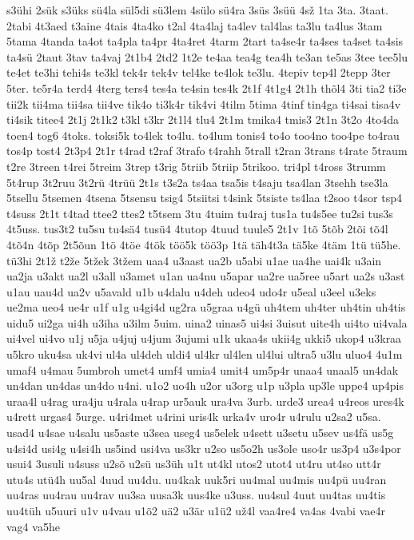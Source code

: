 {s3ühi
2sük
s3üks
sü4la
sül5di
sü3lem
4sülo
sü4ra
3süs
3süü
4sž
1ta
3ta.
3taat.
2tabi
4t3aed
t3aine
4tais
4ta4ko
t2al
4ta4laj
ta4lev
tal4las
ta3lu
ta4lus
3tam
5tama
4tanda
ta4ot
ta4pla
ta4pr
4ta4ret
4tarm
2tart
ta4se4r
ta4ses
ta4set
ta4sis
ta4sü
2taut
3tav
ta4vaj
2t1b4
2td2
1t2e
te4aa
tea4g
tea4h
te3an
te5as
3tee
tee5lu
te4et
te3hi
tehi4s
te3kl
tek4r
tek4v
tel4ke
te4lok
te3lu.
4tepiv
tep4l
2tepp
3ter
5ter.
te5r4a
terd4
4terg
ters4
tes4a
te4sin
tes4k
2t1f
4t1g4
2t1h
thõl4
3ti
tia2
ti3e
tii2k
tii4ma
tii4sa
tii4ve
tik4o
ti3k4r
tik4vi
4tilm
5tima
4tinf
tin4ga
ti4sai
tisa4v
ti4sik
titee4
2t1j
2t1k2
t3kl
t3kr
2t1l4
tlu4
2t1m
tmika4
tmis3
2t1n
3t2o
4to4da
toen4
tog6
4toks.
toksi5k
to4lek
to4lu.
to4lum
tonis4
to4o
too4no
too4pe
to4rau
tos4p
tost4
2t3p4
2t1r
t4rad
t2raf
3trafo
t4rahh
5trall
t2ran
3trans
t4rate
5traum
t2re
3treen
t4rei
5treim
3trep
t3rig
5triib
5triip
5trikoo.
tri4pl
t4ross
3trumm
5t4rup
3t2ruu
3t2rü
4trüü
2t1s
t3s2a
ts4aa
tsa5is
t4saju
tsa4lan
3tsehh
tse3la
5tsellu
5tsemen
4tsena
5tsensu
tsig4
5tsiitsi
t4sink
5tsiste
ts4laa
t2soo
t4sor
tsp4
t4suss
2t1t
t4tad
ttee2
ttes2
t5tsem
3tu
4tuim
tu4raj
tus1a
tu4s5ee
tu2si
tus3s
4t5uss.
tus3t2
tu5su
tu4sä4
tusü4
4tutop
4tuud
tuule5
2t1v
1tõ
5tõb
2tõi
tõ4l
4tõ4n
4tõp
2t5õun
1tö
4töe
4tök
töö5k
töö3p
1tä
täh4t3a
tä5ke
4täm
1tü
tü5he.
tü3hi
2t1ž
t2že
5tžek
3tžem
uaa4
u3aast
ua2b
u5abi
u1ae
ua4he
uai4k
u3ain
ua2ja
u3akt
ua2l
u3all
u3amet
u1an
ua4nu
u5apar
ua2re
ua5ree
u5art
ua2s
u3ast
u1au
uau4d
ua2v
u5avald
u1b
u4dalu
u4deh
udeo4
udo4r
u5eal
u3eel
u3eks
ue2ma
ueo4
ue4r
u1f
u1g
u4gi4d
ug2ra
u5graa
u4gü
uh4tem
uh4ter
uh4tin
uh4tis
uidu5
ui2ga
ui4h
u3iha
u3ilm
5uim.
uina2
uinas5
ui4si
3uisut
uite4h
ui4to
ui4vala
ui4vel
ui4vo
u1j
u5ja
u4juj
u4jum
3ujumi
u1k
ukaa4s
ukii4g
ukki5
ukop4
u3kraa
u5kro
uku4sa
uk4vi
ul4a
ul4deh
uldi4
ul4kr
ul4len
ul4lui
ultra5
u3lu
uluo4
4u1m
umaf4
u4mau
5umbroh
umet4
umf4
umia4
umit4
um5p4r
unaa4
unaal5
un4dak
un4dan
un4das
un4do
u4ni.
u1o2
uo4h
u2or
u3org
u1p
u3pla
up3le
uppe4
up4pis
uraa4l
u4rag
ura4ju
u4rala
u4rap
ur5auk
ura4va
3urb.
urde3
urea4
u4reos
ures4k
u4rett
urgas4
5urge.
u4ri4met
u4rini
uris4k
urka4v
uro4r
u4rulu
u2sa2
u5sa.
usad4
u4sae
u4salu
us5aste
u3sea
useg4
us5elek
u4sett
u3setu
u5sev
us4fä
us5g
u4si4d
usi4g
u4si4h
us5ind
usi4va
us3kr
u2so
us5o2h
us3ole
uso4r
us3p4
u3s4por
usui4
3usuli
u4suss
u2sõ
u2sü
us3üh
u1t
ut4kl
utos2
utot4
ut4ru
ut4so
utt4r
utu4s
utü4h
uu5al
4uud
uu4du.
uu4kak
uuk5ri
uu4mal
uu4mis
uu4pü
uu4ran
uu4ras
uu4rau
uu4rav
uu3sa
uusa3k
uus4ke
u3uss.
uu4sul
4uut
uu4tas
uu4tis
uu4tüh
u5uuri
u1v
u4vau
u1õ2
uä2
u3är
u1ü2
už4l
vaa4re4
va4as
4vabi
vae4r
vag4
va5he
}
